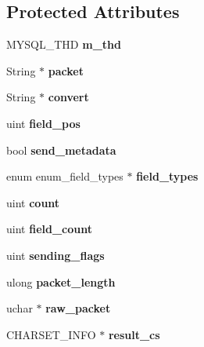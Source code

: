 \subsection*{Protected Attributes}
\begin{DoxyCompactItemize}
\item 
\mbox{\label{classProtocol__classic_a23a3f833f62c0aefbe15d9d4fdea6a48}} 
M\+Y\+S\+Q\+L\+\_\+\+T\+HD {\bfseries m\+\_\+thd}
\item 
\mbox{\label{classProtocol__classic_a7c58a66429de2cc324ffa183779daf31}} 
String $\ast$ {\bfseries packet}
\item 
\mbox{\label{classProtocol__classic_abe23c645ae55fc75a748afb469e12da4}} 
String $\ast$ {\bfseries convert}
\item 
\mbox{\label{classProtocol__classic_aab655f340c17a4adee6c8635a6965eea}} 
uint {\bfseries field\+\_\+pos}
\item 
\mbox{\label{classProtocol__classic_af27620f6a5e834eda91086e8d2b81444}} 
bool {\bfseries send\+\_\+metadata}
\item 
\mbox{\label{classProtocol__classic_a314e26249ea5122e95535c1f0444cc63}} 
enum enum\+\_\+field\+\_\+types $\ast$ {\bfseries field\+\_\+types}
\item 
\mbox{\label{classProtocol__classic_ab2e97f74bd6625798d9dbba0327fb2ce}} 
uint {\bfseries count}
\item 
\mbox{\label{classProtocol__classic_a94a04f735f185183aae7f88f933e93fa}} 
uint {\bfseries field\+\_\+count}
\item 
\mbox{\label{classProtocol__classic_a86599cdbc5b393495e28c4c1c76cd02b}} 
uint {\bfseries sending\+\_\+flags}
\item 
\mbox{\label{classProtocol__classic_a4c6f6e5a5487ddab26949d3e1df4782a}} 
ulong {\bfseries packet\+\_\+length}
\item 
\mbox{\label{classProtocol__classic_a82c00b9fe31eb08c636e14a6eabeeeb7}} 
uchar $\ast$ {\bfseries raw\+\_\+packet}
\item 
\mbox{\label{classProtocol__classic_aa6c244b547f280e313f0be1ff4f79109}} 
C\+H\+A\+R\+S\+E\+T\+\_\+\+I\+N\+FO $\ast$ {\bfseries result\+\_\+cs}
\end{DoxyCompactItemize}
